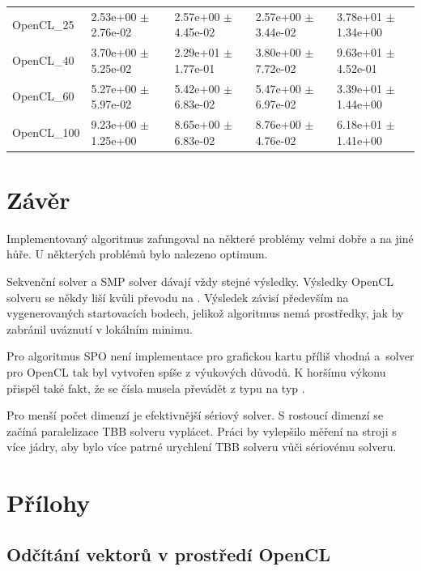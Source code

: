 \documentclass[12pt, a4paper]{report}
\begin{document}
\begin{table}
\begin{tabular}{l|l|l|l|l}
		OpenCL\_25 & 2.53e+00 $\pm$ 2.76e-02 & 2.57e+00 $\pm$ 4.45e-02 & 2.57e+00 $\pm$ 3.44e-02 & 3.78e+01 $\pm$ 1.34e+00 \\
		OpenCL\_40 & 3.70e+00 $\pm$ 5.25e-02 & 2.29e+01 $\pm$ 1.77e-01 & 3.80e+00 $\pm$ 7.72e-02 & 9.63e+01 $\pm$ 4.52e-01 \\
		OpenCL\_60 & 5.27e+00 $\pm$ 5.97e-02 & 5.42e+00 $\pm$ 6.83e-02 & 5.47e+00 $\pm$ 6.97e-02 & 3.39e+01 $\pm$ 1.44e+00 \\
		OpenCL\_100 & 9.23e+00 $\pm$ 1.25e+00 & 8.65e+00 $\pm$ 6.83e-02 & 8.76e+00 $\pm$ 4.76e-02 & 6.18e+01 $\pm$ 1.41e+00 \\
	\end{tabular}
\end{table}

\chapter{Závěr}
Implementovaný algoritmus zafungoval na některé problémy velmi dobře a na jiné hůře. U některých problémů bylo nalezeno optimum.

Sekvenční solver a SMP solver dávají vždy stejné výsledky. Výsledky OpenCL solveru se někdy liší kvůli převodu na .
Výsledek závisí především na vygenerovaných startovacích bodech, jelikož algoritmus nemá prostředky, jak by zabránil uváznutí v lokálním minimu.

Pro algoritmus SPO není implementace pro grafickou kartu příliš vhodná a~solver pro OpenCL tak byl vytvořen spíše z výukových důvodů.
K horšímu výkonu přispěl také fakt, že se čísla musela převádět z typu  na typ .

Pro menší počet dimenzí je efektivnější sériový solver. S rostoucí dimenzí se začíná paralelizace TBB solveru vyplácet.
Práci by vylepšilo měření na stroji s více jádry, aby bylo více patrné urychlení TBB solveru vůči sériovému solveru.




\chapter*{Přílohy}
\section*{Odčítání vektorů v prostředí OpenCL}

\end{document}

